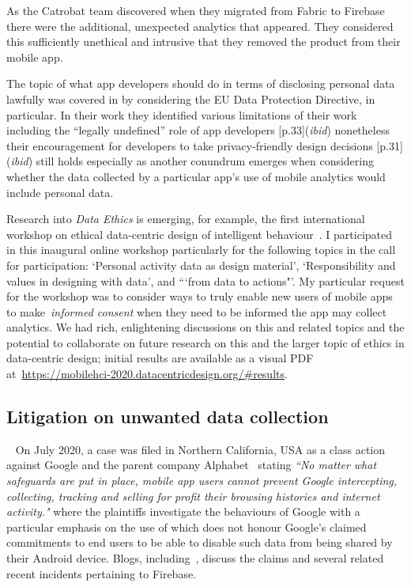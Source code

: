 As the Catrobat team discovered when they migrated from Fabric to Firebase there were the additional, unexpected analytics that appeared. They considered this sufficiently unethical and intrusive that they removed the product from their mobile app.

The topic of what app developers should do in terms of disclosing personal data lawfully was covered in  by considering the EU Data Protection Directive, in particular. In their work they identified various limitations of their work including the ``legally undefined'' role of app developers [p.33](\emph{ibid}) nonetheless their encouragement for developers to take privacy-friendly design decisions [p.31](\emph{ibid}) still holds especially as another conundrum emerges when considering whether the data collected by a particular app's use of mobile analytics would include personal data. 

Research into \emph{Data Ethics} is emerging, for example, the first international workshop on ethical data-centric design of intelligent behaviour~. I participated in this inaugural online workshop particularly for the following topics in the call for participation: `Personal activity data as design material', `Responsibility and values in designing with data', and ```from data to actions"'. My particular request for the workshop was to consider ways to truly enable new users of mobile apps to make~\emph{informed consent} when they need to be informed the app may collect analytics. We had rich, enlightening discussions on this and related topics and the potential to collaborate on future research on this and the larger topic of ethics in data-centric design; initial results are available as a visual PDF at~\url{https://mobilehci-2020.datacentricdesign.org/#results}.

\subsection{Litigation on unwanted data collection}~\label{discussion-litigation-on-unwanted-data-collection-topic}
On  July 2020, a case was filed in Northern California, USA as a class action against Google and the parent company Alphabet~\cite{rodriguez_et_al_v_google_llc_et_al_2020} stating \emph{``No matter what safeguards are put in place, mobile app users cannot prevent Google intercepting, collecting, tracking and selling for profit their browsing histories and internet activity."} where the plaintiffs investigate the behaviours of Google with a particular emphasis on the use of  which does not honour Google's claimed commitments to end users to be able to disable such data from being shared by their Android device. Blogs, including~, discuss the claims and several related recent incidents pertaining to Firebase.

